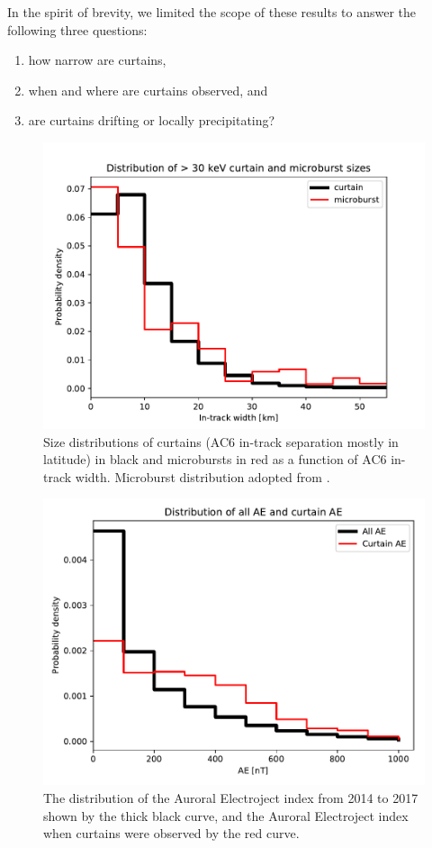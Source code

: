 \documentclass[draft]{agujournal2019}
\begin{document}
In the spirit of brevity, we limited the scope of these results to answer the following three questions:

\begin{enumerate}
\item how narrow are curtains,
\item when and where are curtains observed, and
\item are curtains drifting or locally precipitating?
\end{enumerate}

\begin{figure}
\includegraphics[width=\textwidth]{ac6_curtain_microburst_width_dist.pdf}
\caption{Size distributions of curtains (AC6 in-track separation mostly in latitude) in black and microbursts in red as a function of AC6 in-track width. Microburst distribution adopted from .}
\label{ae_width_dist}
\end{figure}

\begin{figure}
\includegraphics[width=\textwidth]{ac6_curtain_AE_dist.pdf}
\caption{The distribution of the Auroral Electroject index from 2014 to 2017 shown by the thick black curve, and the Auroral Electroject index when curtains were observed by the red curve.}
\label{ae_width_dist}
\end{figure}
\end{document}
